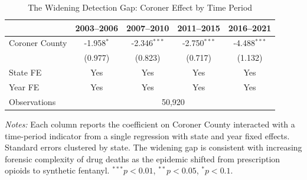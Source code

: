\begin{table}[t]
\centering
\caption{The Widening Detection Gap: Coroner Effect by Time Period}
\label{tab:time}
\begin{tabular}{lcccc}
\hline\hline
 & 2003--2006 & 2007--2010 & 2011--2015 & 2016--2021 \\
\hline
Coroner County & -1.958$^{*}$ & -2.346$^{***}$ & -2.750$^{***}$ & -4.488$^{***}$ \\
 & (0.977) & (0.823) & (0.717) & (1.132) \\
\hline
State FE & Yes & Yes & Yes & Yes \\
Year FE & Yes & Yes & Yes & Yes \\
Observations & \multicolumn{4}{c}{50,920} \\
\hline\hline
\end{tabular}
\begin{tablenotes}
\item \textit{Notes:} Each column reports the coefficient on Coroner County interacted with a time-period indicator from a single regression with state and year fixed effects. Standard errors clustered by state. The widening gap is consistent with increasing forensic complexity of drug deaths as the epidemic shifted from prescription opioids to synthetic fentanyl. $^{***}p<0.01$, $^{**}p<0.05$, $^{*}p<0.1$.
\end{tablenotes}
\end{table}
